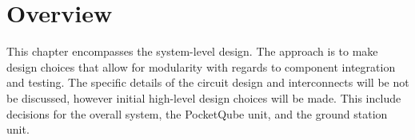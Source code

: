 \section{Overview}
This chapter encompasses the system-level design. The approach is to make design choices that allow for modularity with regards to component integration and testing. The specific details of the circuit design and interconnects will be not be discussed, however initial high-level design choices will be made. This include decisions for the overall system, the PocketQube unit, and the ground station unit.